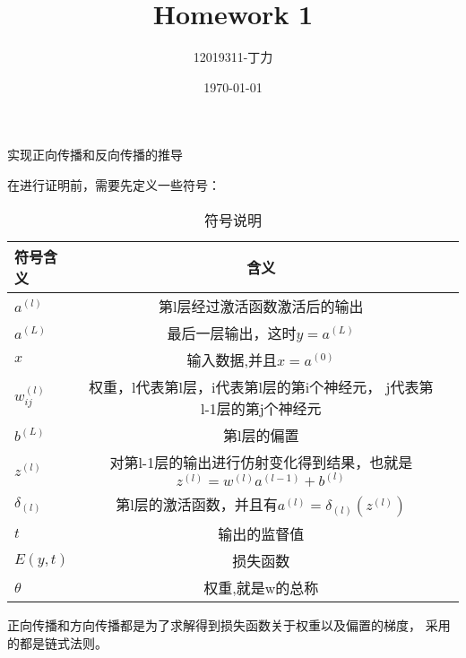 \documentclass{homework}
\author{12019311-丁力}
\date{\today}
\title{ Homework 1}
\begin{document}
 \maketitle

\question 实现正向传播和反向传播的推导


在进行证明前，需要先定义一些符号：
\begin{table}[htbp]
	\centering 
	\caption{\label{tab:test}符号说明}
	\begin{tabular}{lcr}
		\toprule
		符号含义 & 含义  \\
		\midrule
		$a^{(l)}$ & 第l层经过激活函数激活后的输出 \\

		$a^{(L)}$ & 最后一层输出，这时$y=a^{(L)}$ \\
		$x$ & 输入数据,并且$x=a^{(0)}$ \\
		$w_{ij}^{(l)}$ & 权重，l代表第l层，i代表第l层的第i个神经元，
		j代表第l-1层的第j个神经元 \\
		$b^{(L)}$ & 第l层的偏置 \\
		$z^{(l)}$ & 对第l-1层的输出进行仿射变化得到结果，也就是
		$z^{(l)} =w^{(l)}a^{(l-1)} +b^{(l)} $\\
		$\delta_{(l)}$ & 第l层的激活函数，并且有$a^{(l)} = 
		\delta_{(l)}(z^{(l)})$\\
		$t$ & 输出的监督值 \\
		$E(y,t)$ & 损失函数 \\
		$\theta$ & 权重,就是w的总称 \\
		\bottomrule
	\end{tabular}
\end{table}

正向传播和方向传播都是为了求解得到损失函数关于权重以及偏置的梯度，
采用的都是链式法则。
\iffalse
\noindent Rather than finding the shortest path between two points, suppose our car is low on gas, so we want to take the path that uses the least fuel. In the real world, navigation optimized for fuel consumption may take more steps to reach a destination \footnote{\href{https://blog.google/products/maps/3-new-ways-navigate-more-sustainably-maps/}{Google Maps Blog}}. 

Consider the same MDP, but with two new ``efficient actions'' -- move right or move down. For example, starting from state 3, you can either move to state 4 or 9. Once again, the actions are deterministic and always succeed unless you run into a wall. Attempting to move in the direction of a wall from a gray square using an efficient action results in you moving \textit{down} one square. For clarity, we will use separate symbols $r_s$ for the reward associated with an inefficient action (right $\&$ up, or  right $\&$ down) and $r_e$ for the reward associated with an efficient action.
\fi 
\end{document}
